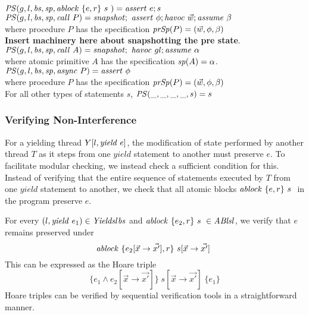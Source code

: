 $\mathit{PS}(g, l, \mathit{bs}, \mathit{sp}, \mathit{ablock}\ {\{e,r\}}\ {s}\ ) =  \mathit{assert}\ e; s$\\
$\mathit{PS}(g, l, \mathit{bs}, \mathit{sp}, \mathit{call}\ P) =  \mathit{snapshot};\ \mathit{assert}\ \phi; \mathit{havoc}\ \vec{w}; \mathit{assume}\ \beta$\\
where procedure $P$ has the specification $\mathit{prSp}(P) = (\vec{w}, \phi, \beta)$\\
{\bf Insert machinery here about snapshotting the pre state}.\\
$\mathit{PS}(g, l, \mathit{bs}, \mathit{sp}, \mathit{call}\ A) =  \mathit{snapshot};\ \mathit{havoc}\ gl; \mathit{assume}\ \alpha$\\
where atomic primitive $A$ has the specification $\mathit{sp}(A) = \alpha$.\\
$\mathit{PS}(g, l, \mathit{bs}, \mathit{sp}, \mathit{async}\ P) =  \mathit{assert}\ \phi $\\
where procedure $P$ has the specification $\mathit{prSp}(P) = (\vec{w}, \phi, \beta)$\\
For all other types of statements $s$, $\mathit{PS}(\_, \_, \_, \_,s) =  s$\\

\subsubsection{Verifying Non-Interference}
For a yielding thread $Y[l, \mathit{yield}\ e]$, the modification of state performed by another thread $T$ as it steps from one $yield$ statement to another must preserve $e$. To facilitate modular checking, we instead check a sufficient condition for this. Instead of verifying that the entire sequence of statements executed by $T$ from one $yield$ statement to another, we check that all atomic blocks $\mathit{ablock}\ {\{e,r\}}\ {s}\ $ in the program preserve $e$.

For every $(l,\mathit{yield}\ e_1) \in \mathit{Yields} l \mathit{bs}$ and $\mathit{ablock}\ {\{e_2,r\}}\ {s}\  \in \mathit{ABls} l$, we verify that $e$ remains preserved under 
$$\mathit{ablock}\ {\{e_2[\vec{x} \rightarrow \vec{x'}],  r\}}\ {s[\vec{x} \rightarrow \vec{x'}]}\ $$
This can be expressed as the Hoare triple 
$$\{ e_1 \wedge e_2[\vec{x} \rightarrow \vec{x'}] \} \; s[\vec{x} \rightarrow \vec{x'}] \; \{ e_1 \}$$
Hoare triples can be verified by sequential verification tools in a straightforward manner. 

